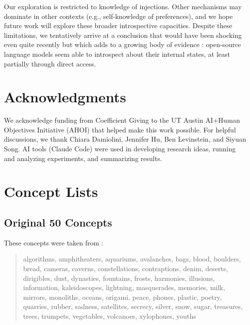 \documentclass{article}
\begin{document}
Our exploration is restricted to knowledge of injections. Other mechanisms may dominate in other contexts (e.g., self-knowledge of preferences), and we hope future work will explore these broader introspective capacities.
Despite these limitations, we tentatively arrive at a conclusion that would have been shocking even quite recently but which adds to a growing body of evidence \citep[e.g.,][]{binder2025looking,lindsey_introspection_2025}: open-source language models seem able to introspect about their internal states, at least partially through direct access.

\section{Acknowledgments}

We acknowledge funding from Coefficient Giving to the UT Austin AI+Human Objectives Initiative (AHOI) that helped make this work possible. For helpful discussions, we thank Chiara Damiolini, Jennifer Hu, Ben Levinstein, and Siyuan Song.
AI tools (Claude Code) were used in developing research ideas, running and analyzing experiments, and summarizing results. 






\appendix

\section{Concept Lists}
\label{app:concepts}

\subsection{Original 50 Concepts}

These concepts were taken from \citet{lindsey_introspection_2025}:

\begin{quote}
\small
algorithms, amphitheaters, aquariums, avalanches, bags, blood, boulders, bread, cameras, caverns, constellations, contraptions, denim, deserts, dirigibles, dust, dynasties, fountains, frosts, harmonies, illusions, information, kaleidoscopes, lightning, masquerades, memories, milk, mirrors, monoliths, oceans, origami, peace, phones, plastic, poetry, quarries, rubber, sadness, satellites, secrecy, silver, snow, sugar, treasures, trees, trumpets, vegetables, volcanoes, xylophones, youths
\end{quote}
\end{document}
